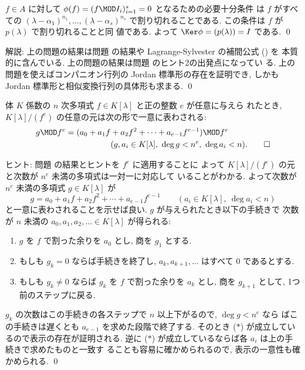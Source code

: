 \documentclass[12pt,twoside]{jarticle}
\begin{document}
$f\in A$ に対して $\phi(f)=(f\MOD I_i)_{i=1}^s = 0$ となるための必要十分条件
は $f$ がすべての $(\lambda-\alpha_1)^{n_1},\dots,(\lambda-\alpha_s)^{n_s}$ 
で割り切れることである.  この条件は $f$ が $p(\lambda)$ で割り切れることと同
値である.  よって $\Ker\phi=(p(\lambda))=I$ である.
\qed

\medskip
\noindent
解説: 上の問題の結果は問題  の結果や
Lagrange-Sylvester の補間公式 () を
本質的に含んでいる.
上の問題の結果は問題  のヒント2の出発点になってい
る.  上の問題を使えばコンパニオン行列の Jordan 標準形の存在を証明でき,
しかも Jordan 標準形と相似変換行列の具体形も求まる.
\qed


\begin{question}[$f$ 進展開]
\label{q:f-adic}
  体 $K$ 係数の $n$ 次多項式 $f\in K[\lambda]$ と正の整数 $e$ が任意に与えら
  れたとき,  $K[\lambda]/(f^e)$ の任意の元は次の形で一意に表わされる:
  \begin{align*}
    &
    g\MOD f^e 
    = (a_0 + a_1 f + a_2 f^2 + \cdots + a_{e-1} f^{e-1})\MOD f^e
    \\ &
    \hphantom{
    g\MOD f^e 
    = (a_0 + a_1 f 
    }
    (g,a_i\in K[\lambda],\ \deg g < n^e,\ \deg a_i < n).
    \qed
  \end{align*}
\end{question}

\noindent
ヒント: 問題  の結果とヒントを $f^e$ に適用することに
よって $K[\lambda]/(f^e)$ の元と次数が $n^e$ 未満の多項式は一対一に対応して
いることがわかる.  よって次数が $n^e$ 未満の多項式 $g\in K[\lambda]$ が
\begin{equation*}
  g = a_0 + a_1 f + a_2 f^2 + \cdots + a_{e-1} f^{e-1}
  \qquad
  (a_i\in K[\lambda],\ \deg a_i < n)
  \tag{$\ast$}
\end{equation*}
と一意に表わされることを示せば良い.  
$g$ が与えられたとき以下の手続きで
次数が $n$ 未満の $a_0,a_1,a_2,\ldots\in K[\lambda]$ が得られる:
\begin{enumerate}
\item $g$ を $f$ で割った余りを $a_0$ とし, 商を $g_1$ とする.
\item もしも $g_k=0$ ならば手続きを終了し, $a_k,a_{k+1},\dots$ はすべて $0$ 
  であるとする.
\item もしも $g_k\ne 0$ ならば $g_k$ を $f$ で割った余りを $a_k$ とし,
  商を $g_{k+1}$ として, 1つ前のステップに戻る.
\end{enumerate}
$g_k$ の次数はこの手続きの各ステップで $n$ 以上下がるので, $\deg g<n^e$ なら
ばこの手続きは遅くとも $a_{e-1}$ を求めた段階で終了する.  
そのとき ($\ast$) が成立しているので表示の存在が証明される.
逆に ($\ast$) が成立しているならば各 $a_i$ は上の手続きで求めたものと一致す
ることも容易に確かめられるので, 表示の一意性も確かめられる.
\qed
\end{document}
